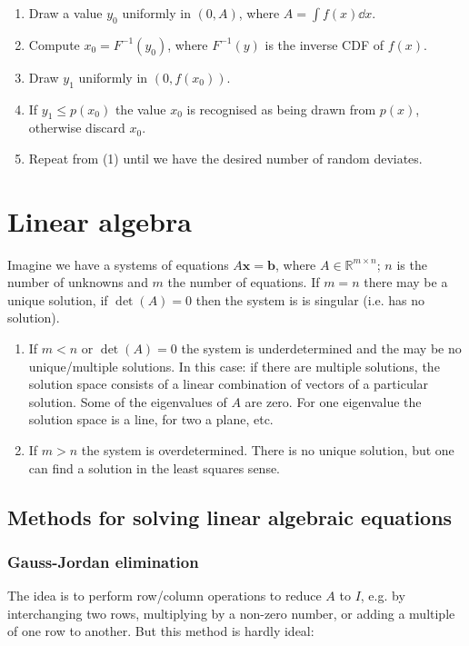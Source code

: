 \documentclass[a4paper]{article}
\newcommand{\R}{\mathbb{R}}
\begin{document}
\begin{enumerate}[(1)]
    \item Draw a value $y_0$ uniformly in $(0, A)$, where $A=\int f(x)\dd{x}$.
    \item Compute $x_0=F^{-1}(y_0)$, where $F^{-1}(y)$ is the inverse CDF of $f(x)$.
    \item Draw $y_1$ uniformly in $(0, f(x_0))$.
    \item If $y_1 \le p(x_0)$ the value $x_0$ is recognised as being drawn from $p(x)$, otherwise discard $x_0$.
    \item Repeat from (1) until we have the desired number of random deviates.
\end{enumerate}

\section{Linear algebra}

Imagine we have a systems of equations $A\mathbf{x}=\mathbf{b}$, where $A\in\R^{m\times n}$; $n$ is the number of unknowns and $m$ the number of equations. If $m=n$ there may be a unique solution, if $\det(A)=0$ then the system is is singular (i.e. has no solution).

\begin{enumerate}[(1)]
    \item If $m<n$ or $\det(A)=0$ the system is underdetermined and the may be no unique/multiple solutions. In this case: if there are multiple solutions, the solution space consists of a linear combination of vectors of a particular solution. Some of the eigenvalues of $A$ are zero. For one eigenvalue the solution space is a line, for two a plane, etc.
    \item If $m>n$ the system is overdetermined. There is no unique solution, but one can find a solution in the least squares sense.
\end{enumerate}

\subsection{Methods for solving linear algebraic equations}

\subsubsection{Gauss-Jordan elimination}

The idea is to perform row/column operations to reduce $A$ to $I$, e.g. by interchanging two rows, multiplying by a non-zero number, or adding a multiple of one row to another. But this method is hardly ideal:
\end{document}
